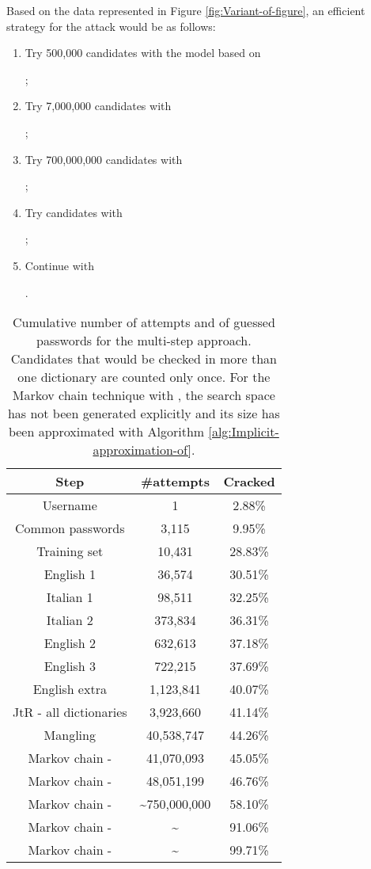 \documentclass[a4paper,twocolumn]{article}
\providecommand{\tabularnewline}{\\}
\begin{document}
Based on the data represented in Figure \ref{fig:Variant-of-figure},
an efficient strategy for the attack would be as follows:
\begin{enumerate}
\item Try 500,000 candidates with the model based on \begin{comment}
 
\end{comment}
{};
\item Try 7,000,000 candidates with \begin{comment}
 
\end{comment}
{};
\item Try 700,000,000 candidates with \begin{comment}
 
\end{comment}
{};
\item Try  candidates with  \begin{comment}
 
\end{comment}
{};
\item Continue with \begin{comment}
 
\end{comment}
{}.
\end{enumerate}
\begin{table}
\begin{centering}
\begin{tabular}{|c|c|c|}
\hline 
Step & \#attempts & Cracked\tabularnewline
\hline
\hline 
Username & 1 & 2.88\%\tabularnewline
\hline 
Common passwords & 3,115 & 9.95\%\tabularnewline
\hline 
Training set & 10,431 & 28.83\%\tabularnewline
\hline 
English 1 & 36,574 & 30.51\%\tabularnewline
\hline 
Italian 1 & 98,511 & 32.25\%\tabularnewline
\hline 
Italian 2 & 373,834 & 36.31\%\tabularnewline
\hline 
English 2 & 632,613 & 37.18\%\tabularnewline
\hline 
English 3 & 722,215 & 37.69\%\tabularnewline
\hline 
English extra & 1,123,841 & 40.07\%\tabularnewline
\hline 
JtR - all dictionaries & 3,923,660 & 41.14\%\tabularnewline
\hline 
Mangling & 40,538,747 & 44.26\%\tabularnewline
\hline 
Markov chain -  & 41,070,093 & 45.05\%\tabularnewline
\hline 
Markov chain -  & 48,051,199 & 46.76\%\tabularnewline
\hline 
Markov chain -  & \textasciitilde{}750,000,000 & 58.10\%\tabularnewline
\hline 
Markov chain -  & \textasciitilde{} & 91.06\%\tabularnewline
\hline 
Markov chain -  & \textasciitilde{} & 99.71\%\tabularnewline
\hline
\end{tabular}
\par\end{centering}

\caption{\label{tab:Dictionary-based-multi-step-approach.}Cumulative number
of attempts and of guessed passwords for the multi-step approach.
Candidates that would be checked in more than one dictionary are counted
only once. For the Markov chain technique with , the search
space has not been generated explicitly and its size has been approximated
with Algorithm \ref{alg:Implicit-approximation-of}.}

\end{table}
\end{document}
